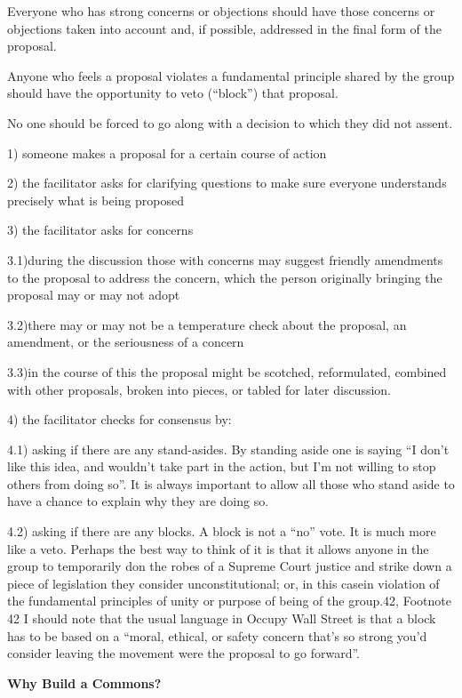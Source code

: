 \documentclass{article}
\begin{document}
Everyone who has strong concerns or objections should have those concerns or objections taken into account and, if possible, addressed in the final form of the proposal.

Anyone who feels a proposal violates a fundamental principle shared by the group should have the opportunity to veto (“block”) that proposal.

No one should be forced to go along with a decision to which they did not assent.

1) someone makes a proposal for a certain course of action

2) the facilitator asks for clarifying questions to make sure everyone understands precisely what is being proposed

3) the facilitator asks for concerns

3.1)during the discussion those with concerns may suggest friendly amendments to the proposal to address the concern, which the person originally bringing the proposal may or may not adopt

3.2)there may or may not be a temperature check about the proposal, an amendment, or the seriousness of a concern

3.3)in the course of this the proposal might be scotched, reformulated, combined with other proposals, broken into pieces, or tabled for later discussion.

4) the facilitator checks for consensus by:

4.1) asking if there are any stand-asides. By standing aside one is saying “I don’t like this idea, and wouldn’t take part in the action, but I’m not willing to stop others from doing so”. It is always important to allow all those who stand aside to have a chance to explain why they are doing so.

4.2) asking if there are any blocks. A block is not a “no” vote. It is much more like a veto. Perhaps the best way to think of it is that it allows anyone in the group to temporarily don the robes of a Supreme Court justice and strike down a piece of legislation they consider unconstitutional; or, in this casein violation of the fundamental principles of unity or purpose of being of the group.{42},
Footnote {42} I should note that the usual language in Occupy Wall Street is that a block has to be based on a “moral, ethical, or safety concern that’s so strong you’d consider leaving the movement were the proposal to go forward”.

\pagebreak
{\huge \textbf{Why Build a Commons?}}
\end{document}
